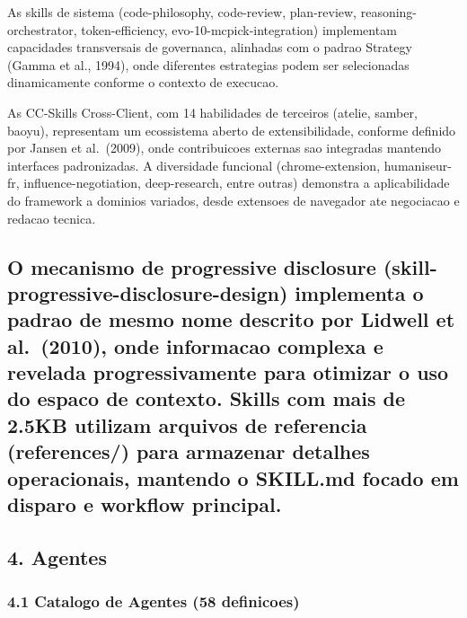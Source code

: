 \documentclass[
  12pt,
]{article}
\begin{document}
As skills de sistema (code-philosophy, code-review, plan-review,
reasoning-orchestrator, token-efficiency, evo-10-mcpick-integration)
implementam capacidades transversais de governanca, alinhadas com o
padrao Strategy (Gamma et al., 1994), onde diferentes estrategias podem
ser selecionadas dinamicamente conforme o contexto de execucao.

As CC-Skills Cross-Client, com 14 habilidades de terceiros (atelie,
samber, baoyu), representam um ecossistema aberto de extensibilidade,
conforme definido por Jansen et al.~(2009), onde contribuicoes externas
sao integradas mantendo interfaces padronizadas. A diversidade funcional
(chrome-extension, humaniseur-fr, influence-negotiation, deep-research,
entre outras) demonstra a aplicabilidade do framework a dominios
variados, desde extensoes de navegador ate negociacao e redacao tecnica.

\subsection{O mecanismo de progressive disclosure
(skill-progressive-disclosure-design) implementa o padrao de mesmo nome
descrito por Lidwell et al.~(2010), onde informacao complexa e revelada
progressivamente para otimizar o uso do espaco de contexto. Skills com
mais de 2.5KB utilizam arquivos de referencia (references/) para
armazenar detalhes operacionais, mantendo o SKILL.md focado em disparo e
workflow
principal.}\label{o-mecanismo-de-progressive-disclosure-skill-progressive-disclosure-design-implementa-o-padrao-de-mesmo-nome-descrito-por-lidwell-et-al.-2010-onde-informacao-complexa-e-revelada-progressivamente-para-otimizar-o-uso-do-espaco-de-contexto.-skills-com-mais-de-2.5kb-utilizam-arquivos-de-referencia-references-para-armazenar-detalhes-operacionais-mantendo-o-skill.md-focado-em-disparo-e-workflow-principal.}

\subsection{4. Agentes}\label{agentes}

\subsubsection{4.1 Catalogo de Agentes (58
definicoes)}\label{catalogo-de-agentes-58-definicoes}
\end{document}
